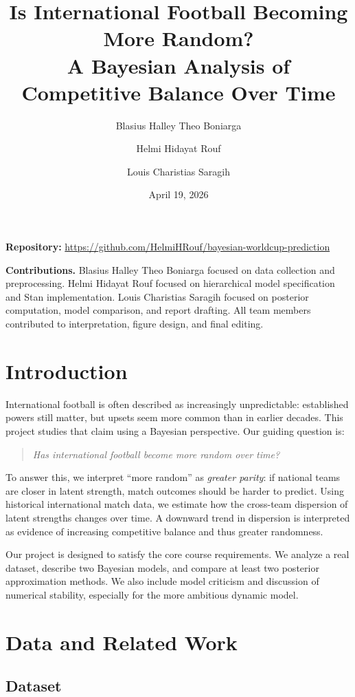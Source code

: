 \documentclass[11pt]{article}
\title{\textbf{Is International Football Becoming More Random?}\\
A Bayesian Analysis of Competitive Balance Over Time}
\author{
Blasius Halley Theo Boniarga \and
Helmi Hidayat Rouf \and
Louis Charistias Saragih
}
\date{April 19, 2026}
\begin{document}
\maketitle

\textbf{Repository:} \url{https://github.com/HelmiHRouf/bayesian-worldcup-prediction}

\textbf{Contributions.} 
Blasius Halley Theo Boniarga focused on data collection and preprocessing.
Helmi Hidayat Rouf focused on hierarchical model specification and Stan implementation.
Louis Charistias Saragih focused on posterior computation, model comparison, and report drafting.
All team members contributed to interpretation, figure design, and final editing.

\section{Introduction}

International football is often described as increasingly unpredictable: established powers still matter, but upsets seem more common than in earlier decades.
This project studies that claim using a Bayesian perspective.
Our guiding question is:
\begin{quote}
\emph{Has international football become more random over time?}
\end{quote}

To answer this, we interpret ``more random'' as \emph{greater parity}: if national teams are closer in latent strength, match outcomes should be harder to predict.
Using historical international match data, we estimate how the cross-team dispersion of latent strengths changes over time.
A downward trend in dispersion is interpreted as evidence of increasing competitive balance and thus greater randomness.

Our project is designed to satisfy the core course requirements.
We analyze a real dataset, describe two Bayesian models, and compare at least two posterior approximation methods.
We also include model criticism and discussion of numerical stability, especially for the more ambitious dynamic model.

\section{Data and Related Work}

\subsection{Dataset}
\end{document}
